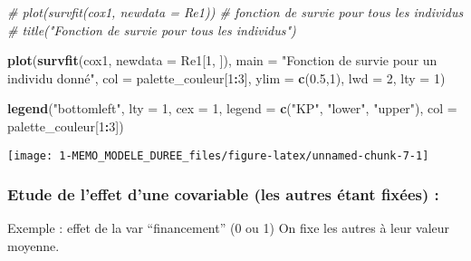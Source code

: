 \documentclass[
]{article}
\newenvironment{Shaded}{\begin{snugshade}}{\end{snugshade}}
\newcommand{\AttributeTok}[1]{\textcolor[rgb]{0.13,0.29,0.53}{#1}}
\newcommand{\CommentTok}[1]{\textcolor[rgb]{0.56,0.35,0.01}{\textit{#1}}}
\newcommand{\DecValTok}[1]{\textcolor[rgb]{0.00,0.00,0.81}{#1}}
\newcommand{\FloatTok}[1]{\textcolor[rgb]{0.00,0.00,0.81}{#1}}
\newcommand{\FunctionTok}[1]{\textcolor[rgb]{0.13,0.29,0.53}{\textbf{#1}}}
\newcommand{\NormalTok}[1]{#1}
\newcommand{\SpecialCharTok}[1]{\textcolor[rgb]{0.81,0.36,0.00}{\textbf{#1}}}
\newcommand{\StringTok}[1]{\textcolor[rgb]{0.31,0.60,0.02}{#1}}
\begin{document}
\begin{Shaded}
\begin{Highlighting}[]
\CommentTok{\# plot(survfit(cox1, newdata = Re1)) \# fonction de survie pour tous les individus}
\CommentTok{\# title("Fonction de survie pour tous les individus")}

\FunctionTok{plot}\NormalTok{(}\FunctionTok{survfit}\NormalTok{(cox1, }\AttributeTok{newdata =}\NormalTok{ Re1[}\DecValTok{1}\NormalTok{, ]),}
     \AttributeTok{main =} \StringTok{"Fonction de survie pour un individu donné"}\NormalTok{,}
     \AttributeTok{col =}\NormalTok{ palette\_couleur[}\DecValTok{1}\SpecialCharTok{:}\DecValTok{3}\NormalTok{], }
     \AttributeTok{ylim =} \FunctionTok{c}\NormalTok{(}\FloatTok{0.5}\NormalTok{,}\DecValTok{1}\NormalTok{), }
     \AttributeTok{lwd =} \DecValTok{2}\NormalTok{, }
     \AttributeTok{lty =} \DecValTok{1}\NormalTok{)}
 
\FunctionTok{legend}\NormalTok{(}\StringTok{"bottomleft"}\NormalTok{,}
       \AttributeTok{lty =} \DecValTok{1}\NormalTok{,}
       \AttributeTok{cex =} \DecValTok{1}\NormalTok{,}
       \AttributeTok{legend =} \FunctionTok{c}\NormalTok{(}\StringTok{"KP"}\NormalTok{, }\StringTok{"lower"}\NormalTok{, }\StringTok{"upper"}\NormalTok{),}
       \AttributeTok{col =}\NormalTok{ palette\_couleur[}\DecValTok{1}\SpecialCharTok{:}\DecValTok{3}\NormalTok{])}
\end{Highlighting}
\end{Shaded}

\begin{center}\texttt{[image: 1-MEMO\_MODELE\_DUREE\_files/figure-latex/unnamed-chunk-7-1]} \end{center}

\hypertarget{etude-de-leffet-dune-covariable-les-autres-uxe9tant-fixuxe9es}{%
\subsubsection{Etude de l'effet d'une covariable (les autres étant
fixées)
:}\label{etude-de-leffet-dune-covariable-les-autres-uxe9tant-fixuxe9es}}

Exemple : effet de la var ``financement'' (0 ou 1) On fixe les autres à
leur valeur moyenne.
\end{document}
